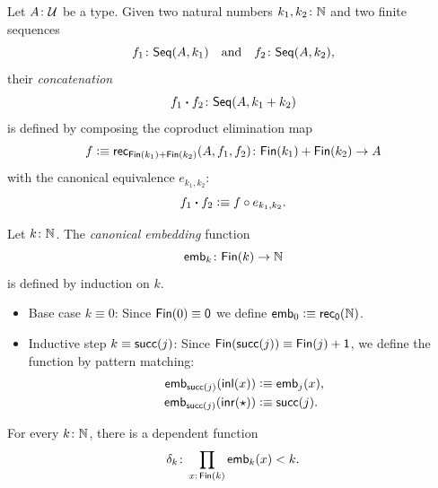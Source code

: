 \begin{defn}
    Let $A\colon\univ$ be a type. Given two natural numbers $k_1,k_2\colon\N$ and two finite sequences
    \[
        f_1\colon\fun{Seq}(A,k_1)
        \quad\text{and}\quad
        f_2\colon\fun{Seq}(A,k_2),
    \]
    their \textsl{concatenation}
    \[
        f_1\ct f_2\colon\fun{Seq}(A,k_1+k_2)
    \]
    is defined by composing the coproduct elimination map 
    \[
        f\defeq\fun{rec}_{\fun{Fin}(k_1)+\fun{Fin}(k_2)}
            (A,f_1,f_2)
            \colon\fun{Fin}(k_1)+\fun{Fin}(k_2)\to A
    \]
    with the canonical equivalence $e_{k_1,k_2}$:
    \[
        f_1\mathbin{\boldsymbol{\cdot}} f_2\mathrel{\vcentcolon}\equiv f\circ e_{k_1,k_2}.
    \]
\end{defn}

\begin{rem}\label{rem:emb}
    Let $k\colon\N$. The \textsl{canonical embedding} function
    \[
        \fun{emb}_k\colon\fun{Fin}(k)\to\N
    \]
    is defined by induction on $k$.
    \begin{itemize}
        \item Base case $k\equiv0$: Since $\mathsf{Fin}(0)\equiv\mathsf{0}$ we define $\mathsf{emb}_0\mathrel{\vcentcolon}\equiv\mathsf{rec}_{\mathsf{0}}(\mathbb{N})$.
        
        \item Inductive step $k\equiv\mathsf{succ}(j)$: Since $\mathsf{Fin}(\mathsf{succ}(j))\equiv\mathsf{Fin}(j)+\mathsf{1}$, we define the function by pattern matching:
        \begin{align*}
            \mathsf{emb}_{\mathsf{succ}(j)}(\mathsf{inl}(x))
                &\mathrel{\vcentcolon}\equiv \mathsf{emb}_j(x),\\
            \mathsf{emb}_{\mathsf{succ}(j)}(\mathsf{inr}({\mathsf{\star}}))
                &\mathrel{\vcentcolon}\equiv\mathsf{succ}(j).
        \end{align*}
    \end{itemize}
\end{rem}

\begin{lem}\label{lem:bounded-Fin-embedding}
    For every\/ $k\colon\N$, there is a dependent function
    \[
        \delta_k\colon\prod_{x\colon\fun{Fin}(k)}
            \fun{emb}_k(x)<k.
    \]
\end{lem}

